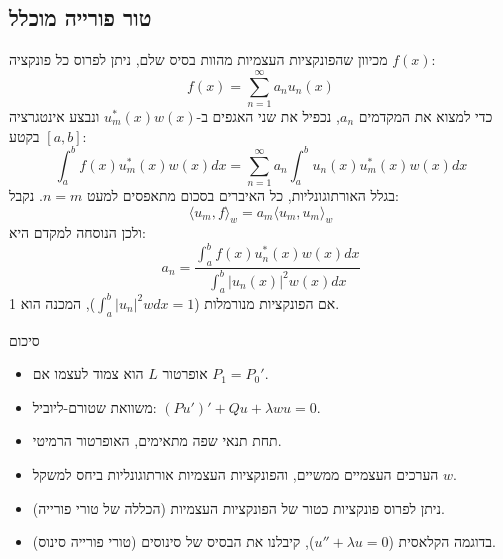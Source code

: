 \subsection*{טור פורייה מוכלל}
מכיוון שהפונקציות העצמיות מהוות בסיס שלם, ניתן לפרוס כל פונקציה $f(x)$:
\[
    f(x) = \sum_{n=1}^{\infty} a_{n} u_{n}(x)
\]
כדי למצוא את המקדמים $a_{n}$, נכפיל את שני האגפים ב-$u_{m}^{*}(x) w(x)$ ונבצע אינטגרציה בקטע $[a,b]$:
\[
    \int_{a}^{b} f(x) u_{m}^{*}(x) w(x)  dx = \sum_{n=1}^{\infty} a_{n} \int_{a}^{b} u_{n}(x) u_{m}^{*}(x) w(x)  dx
\]
בגלל האורתוגונליות, כל האיברים בסכום מתאפסים למעט $n=m$. נקבל:
\[
    \langle u_{m}, f \rangle_{w} = a_{m} \langle u_{m}, u_{m} \rangle_{w}
\]
ולכן הנוסחה למקדם היא:
\[
    \boxed{a_n = \frac{\int_{a}^{b} f(x) u_{n}^{*}(x) w(x)  dx}{\int_{a}^{b} |u_{n}(x)|^{2} w(x)  dx}}
\]
אם הפונקציות מנורמלות ($\int_a^b |u_{n}|^{2} w  dx = 1$), המכנה הוא 1.

\begin{summarybox}
    {סיכום}
    \begin{itemize}
        \item אופרטור $L$ הוא צמוד לעצמו אם $P_{1} = P_{0}'$.
        \item משוואת שטורם-ליוביל: $(Pu')' + Qu + \lambda w u = 0$.
        \item תחת תנאי שפה מתאימים, האופרטור הרמיטי.
        \item הערכים העצמיים ממשיים, והפונקציות העצמיות אורתוגונליות ביחס למשקל $w$.
        \item ניתן לפרוס פונקציות כטור של הפונקציות העצמיות (הכללה של טורי פורייה).
        \item בדוגמה הקלאסית ($u''+\lambda u=0$), קיבלנו את הבסיס של סינוסים (טורי פורייה סינוס).
    \end{itemize}
\end{summarybox}